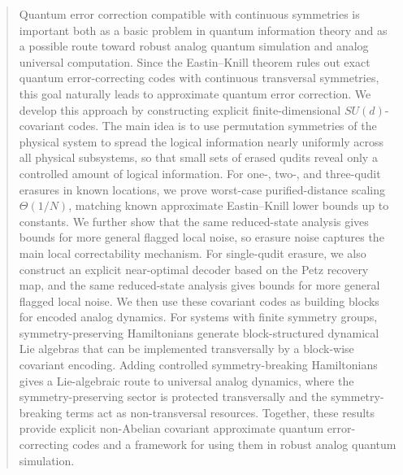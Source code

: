 \documentclass[10pt,twocolumn,superscriptaddress,aps,amsmath,amssymb,citeautoscript,floatfix,prx]{revtex4-2}
\makeatletter
\def\maketitle{
\@author@finish
\title@column\titleblock@produce
\suppressfloats[t]}
\newcounter{alg}
\theoremstyle{plain}
\theoremstyle{plain}
\theoremstyle{plain}
\theoremstyle{plain}
\theoremstyle{plain}
\theoremstyle{plain}
\makeatother
\begin{document}
\begin{abstract}
Quantum error correction compatible with continuous symmetries is important both as a basic problem in quantum information theory and as a possible route toward robust analog quantum simulation and analog universal computation. Since the Eastin--Knill theorem rules out exact quantum error-correcting codes with continuous transversal symmetries, this goal naturally leads to approximate quantum error correction. We develop this approach by constructing explicit finite-dimensional \(SU(d)\)-covariant codes. The main idea is to use permutation symmetries of the physical system to spread the logical information nearly uniformly across all physical subsystems, so that small sets of erased qudits reveal only a controlled amount of logical information. For one-, two-, and three-qudit erasures in known locations, we prove worst-case purified-distance scaling \(\Theta(1/N)\), matching known approximate Eastin--Knill lower bounds up to constants. We further show that the same reduced-state analysis gives bounds for more general flagged local noise, so erasure noise captures the main local correctability mechanism. For single-qudit erasure, we also construct an explicit near-optimal decoder based on the Petz recovery map, and the same reduced-state analysis gives bounds for more general flagged local noise.
We then use these covariant codes as building blocks for encoded analog dynamics. For systems with finite symmetry groups, symmetry-preserving Hamiltonians generate block-structured dynamical Lie algebras that can be implemented transversally by a block-wise covariant encoding. Adding controlled symmetry-breaking Hamiltonians gives a Lie-algebraic route to universal analog dynamics, where the symmetry-preserving sector is protected transversally and the symmetry-breaking terms act as non-transversal resources. Together, these results provide explicit non-Abelian covariant approximate quantum error-correcting codes and a framework for using them in robust analog quantum simulation.
\end{abstract}
\maketitle 
\end{document}
